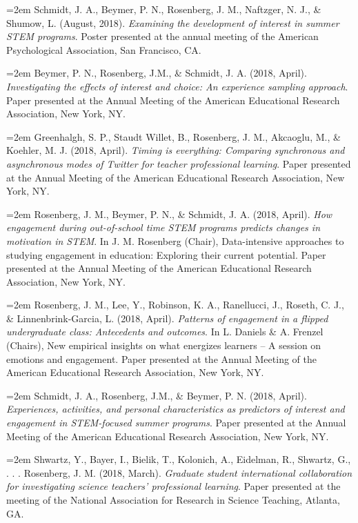 \documentclass[
  14,
]{article}
\begin{document}
\hangindent=2em Schmidt, J. A., Beymer, P. N., Rosenberg, J. M.,
Naftzger, N. J., \& Shumow, L. (August, 2018). \emph{Examining the
development of interest in summer STEM programs}. Poster presented at
the annual meeting of the American Psychological Association, San
Francisco, CA.

\hangindent=2em Beymer, P. N., Rosenberg, J.M., \& Schmidt, J. A. (2018,
April). \emph{Investigating the effects of interest and choice: An
experience sampling approach}. Paper presented at the Annual Meeting of
the American Educational Research Association, New York, NY.

\hangindent=2em Greenhalgh, S. P., Staudt Willet, B., Rosenberg, J. M.,
Akcaoglu, M., \& Koehler, M. J. (2018, April). \emph{Timing is
everything: Comparing synchronous and asynchronous modes of Twitter for
teacher professional learning}. Paper presented at the Annual Meeting of
the American Educational Research Association, New York, NY.

\hangindent=2em Rosenberg, J. M., Beymer, P. N., \& Schmidt, J. A.
(2018, April). \emph{How engagement during out-of-school time STEM
programs predicts changes in motivation in STEM}. In J. M. Rosenberg
(Chair), Data-intensive approaches to studying engagement in education:
Exploring their current potential. Paper presented at the Annual Meeting
of the American Educational Research Association, New York, NY.

\hangindent=2em Rosenberg, J. M., Lee, Y., Robinson, K. A., Ranellucci,
J., Roseth, C. J., \& Linnenbrink-Garcia, L. (2018, April).
\emph{Patterns of engagement in a flipped undergraduate class:
Antecedents and outcomes}. In L. Daniels \& A. Frenzel (Chairs), New
empirical insights on what energizes learners -- A session on emotions
and engagement. Paper presented at the Annual Meeting of the American
Educational Research Association, New York, NY.

\hangindent=2em Schmidt, J. A., Rosenberg, J.M., \& Beymer, P. N. (2018,
April). \emph{Experiences, activities, and personal characteristics as
predictors of interest and engagement in STEM-focused summer programs}.
Paper presented at the Annual Meeting of the American Educational
Research Association, New York, NY.

\hangindent=2em Shwartz, Y., Bayer, I., Bielik, T., Kolonich, A.,
Eidelman, R., Shwartz, G., . . . Rosenberg, J. M. (2018, March).
\emph{Graduate student international collaboration for investigating
science teachers' professional learning}. Paper presented at the meeting
of the National Association for Research in Science Teaching, Atlanta,
GA.
\end{document}
